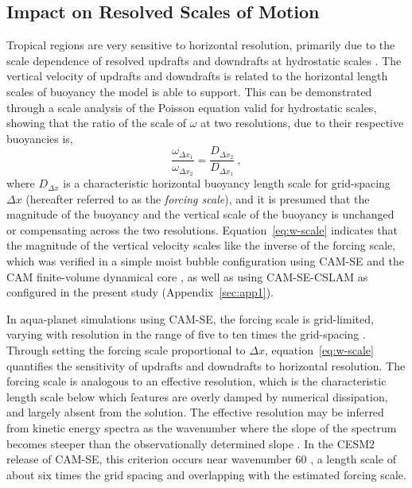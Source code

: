 \documentclass[draft,linenumbers]{agujournal}
\begin{document}
\subsection{Impact on Resolved Scales of Motion}\label{sec:aquaplanet}

Tropical regions are very sensitive to horizontal resolution, primarily due to the scale dependence of resolved updrafts and downdrafts at hydrostatic scales \citep{WETAL1997MWR,PG2006JAS,J2017JAMES,HR2017JCLIM,HR2018JAMES}. The vertical velocity of updrafts and downdrafts is related to the horizontal length scales of buoyancy the model is able to support. This can be demonstrated through a scale analysis of the Poisson equation \citep{JR2016QJRMS} valid for hydrostatic scales, showing that the ratio of the scale of $\omega$ at two resolutions, due to their respective buoyancies is,
\begin{equation}
\frac{\omega_{\Delta x_1}}{\omega_{\Delta x_2}} =  \frac{D_{\Delta x_2}}{D_{\Delta x_1}}~,\label{eq:w-scale}
\end{equation}
where $D_{\Delta x}$ is a characteristic horizontal buoyancy length scale for grid-spacing $\Delta x$ (hereafter referred to as the {\em{forcing scale}}), and it is presumed that the magnitude of the buoyancy and the vertical scale of the buoyancy is unchanged or compensating across the two resolutions. Equation~\eqref{eq:w-scale} indicates that the magnitude of the vertical velocity scales like the inverse of the forcing scale, which was verified in a simple moist bubble configuration using CAM-SE and the CAM finite-volume dynamical core \citep{HR2018JAMES}, as well as using CAM-SE-CSLAM as configured in the present study (Appendix~\ref{sec:app1}).

In aqua-planet simulations using CAM-SE, the forcing scale is grid-limited, varying with resolution in the range of five to ten times the grid-spacing \citep{HR2018JAMES}. Through setting the forcing scale proportional to $\Delta x$, equation~\eqref{eq:w-scale} quantifies the sensitivity of updrafts and downdrafts to horizontal resolution. The forcing scale is analogous to an effective resolution, which is the characteristic length scale below which features are overly damped by numerical dissipation, and largely absent from the solution. The effective resolution may be inferred from kinetic energy spectra as the wavenumber where the slope of the spectrum becomes steeper than the observationally determined slope \citep{S2011LNCSE}. In the CESM2 release of CAM-SE, this criterion occurs near wavenumber 60 \citep[see Figure 6 in][]{LetAl2018JAMES}, a length scale of about six times the grid spacing and overlapping with the estimated forcing scale.
\end{document}
